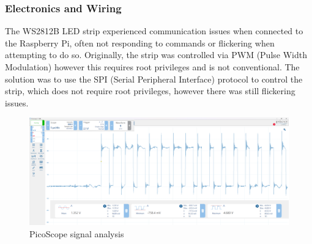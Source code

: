\subsubsection{Electronics and Wiring}
The WS2812B LED strip experienced communication issues when connected to the Raspberry Pi, often not responding to commands or flickering when attempting to do so. Originally, the strip was controlled via PWM (Pulse Width Modulation) however this requires root privileges and is not conventional. The solution was to use the SPI (Serial Peripheral Interface) protocol to control the strip, which does not require root privileges, however there was still flickering issues.

\begin{figure}[H]
    \centering
    \includegraphics[width=\textwidth]{imgs/graphs/oscilloscope.png}
    \caption{PicoScope signal analysis}
    \label{fig:oscilloscope}
  \end{figure}

